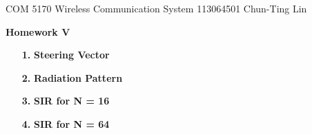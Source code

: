 \documentclass[letterpaper,12pt]{article}
\begin{document}
  \noindent COM 5170 Wireless Communication System \hfill 113064501  Chun-Ting Lin \\

  \begin{center}
    {\bf \large  Homework V}
  \end{center}


  \begin{enumerate}
    \item[{\bf 1. }]  \textbf{Steering Vector} \hfill \\
      
    \item[{\bf 2. }]  \textbf{Radiation Pattern} \hfill \\
      
    \item[{\bf 3. }]  \textbf{SIR for N = 16} \hfill \\
      
    \item[{\bf 4. }]  \textbf{SIR for N = 64} \hfill \\
      
  \end{enumerate}
\end{document}
